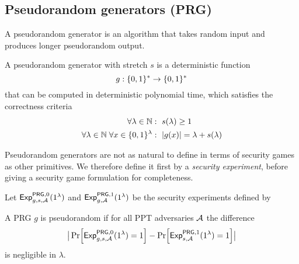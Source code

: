 \newpage
\subsection{Pseudorandom generators (PRG)}
A pseudorandom generator is an algorithm that takes random input and produces longer pseudorandom output.

\begin{syntax}
A pseudorandom generator with stretch $s$ is a deterministic function
  \[g:\{0,1\}^*\rightarrow\{0,1\}^*\] 
that can be computed in deterministic polynomial time, which satisfies the correctness criteria
\begin{align*}
\forall \lambda\in\NN&:\ s(\lambda)\geq 1 \\
\forall \lambda\in\NN\; \forall x\in\bin^\lambda&:\ \abs{g(x)}=\lambda+s(\lambda) \\
\end{align*}
\end{syntax}

Pseudorandom generators are not as natural to define in terms of security games as other primitives. We therefore define it first by a \emph{security experiment}, before giving a security game formulation for completeness.

\begin{security}[Pseudorandomness]
  \vspace{5mm}
Let ${\mathsf{Exp}}_{g,s,\mathcal{A}}^{\mathsf{PRG},0}(1^\lambda)$ and ${\mathsf{Exp}}_{g,\mathcal{A}}^{\mathsf{PRG},1}(1^\lambda)$ be the security experiments defined by
\begin{center}
  \begin{pchstack}
  \pchspace
  \end{pchstack}
  \end{center}
A PRG $g$ is pseudorandom if for all PPT adversaries $\mathcal{A}$ the difference
\[ \big|\prob{{\mathsf{Exp}}_{g,s,\adv}^{\mathsf{PRG},0}(1^\lambda) = 1} 
   - \prob{{\mathsf{Exp}}_{s,\adv}^{\mathsf{PRG},1}(1^\lambda) = 1}\big| \]
is negligible in $\lambda$.
\end{security}


